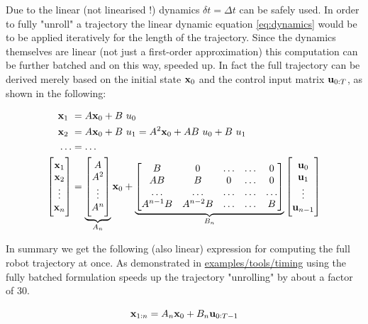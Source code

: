 Due to the linear (not linearised !) dynamics $\delta t = \Delta t$ can be safely used. In order to fully "unroll" a trajectory the linear dynamic equation \ref{eq:dynamics} would be to be applied iteratively for the length of the trajectory. Since the dynamics themselves are linear (not just a first-order approximation) this computation can be further batched and on this way, speeded up. In fact the full trajectory can be derived merely based on the initial state $\mathbf{x}_0$ and the control input matrix $\mathbf{u}_{0:T}$, as shown in the following:

\begin{align}
\x_1 &= A \x_0 + B \ u_0 \\
\x_2 &= A \x_0 + B \ u_1 = A^2 \x_0 + A B \ u_0 + B \ u_1\\ 
\hdots &= \hdots \\
\begin{bmatrix} \x_1 \\ \x_2 \\ \vdots \\ \x_n \end{bmatrix} &= \underbrace{\begin{bmatrix} A \\ A^2 \\ \vdots \\ A^n \end{bmatrix}}_{\substack{A_n}} \x_0 + \underbrace{\begin{bmatrix} B & 0 & \hdots & \hdots & 0 \\ AB & B & 0 & \hdots & 0 \\ \hdots & \hdots & \hdots & \hdots & \hdots \\ A^{n-1} B & A^{n-2} B & \hdots & \hdots & B \end{bmatrix}}_{\substack{B_n}} \begin{bmatrix} \u_0 \\ \u_1 \\ \vdots \\ \u_{n-1} \end{bmatrix}
\end{align}

In summary we get the following (also linear) expression for computing the full robot trajectory at once. As demonstrated in \href{https://github.com/simon-schaefer/mantrap/blob/master/examples/tools/timing.ipynb}{examples/tools/timing} using the fully batched formulation speeds up the trajectory "unrolling" by about a factor of 30.  

\begin{equation}
\mathbf{x}_{1:n} = A_n \mathbf{x}_0 + B_n \mathbf{u}_{0:T-1}
\label{eq:dynamics_stacked}
\end{equation}

